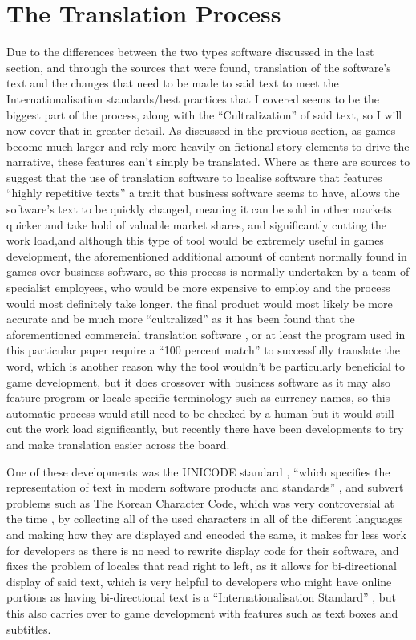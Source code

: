 \documentclass{scrartcl}
\begin{document}
\section{The Translation Process}
Due to the differences between the two types software discussed in the last section, and through the sources that were found, translation of the software's text and the changes that need to be made to said text to meet the Internationalisation standards/best practices that I covered seems to be the biggest part of the process, along with the ``Cultralization'' of said text, so I will now cover that in greater detail. As discussed in the previous section, as games become much larger and rely more heavily on fictional story elements to drive the narrative, these features can't simply be translated. Where as there are sources to suggest that the use of translation software to localise software that features ``highly repetitive texts'' \cite[pg.1]{schaler1994practical} a trait that business software seems to have, allows the software's text to be quickly changed, meaning it can be sold in other markets quicker and take hold of valuable market shares\cite[pg.1]{schaler1994practical}, and significantly cutting the work load,and although this type of tool would be extremely useful in games development, the aforementioned additional amount of content normally found in games over business software, so this process is normally undertaken by a team of specialist employees, who would be more expensive to employ and the process would most definitely take longer, the final product would most likely be more accurate and be much more ``cultralized'' as it has been found that the aforementioned commercial translation software , or at least the program used in this particular paper require a ``100 percent match'' to successfully translate the word, which is another reason why the tool wouldn't be particularly beneficial to game development, but it does crossover with business software as it may also feature program or locale specific terminology such as currency names\cite[pg.2]{schaler1994practical}, so this automatic process would still need to be checked by a human but it would still cut the work load significantly, but recently there have been developments to try and make translation easier across the board.

One of these developments was the UNICODE standard \cite{unicodestandards}, ``which specifies the representation of text in modern software products and standards'' \cite{schaler2004language}, and subvert problems such as The Korean Character Code\cite{park2016korean}, which was very controversial at the time , by collecting all of the used characters in all of the different languages and making how they are displayed and encoded the same, it makes for less work for developers as there is no need to rewrite display code for their software, and fixes the problem of locales that read right to left, as it allows for bi-directional display of said text, which is very helpful to developers who might have online portions as having bi-directional text is a ``Internationalisation Standard'' \cite{standards}, but this also carries over to game development with features such as text boxes and subtitles.  
\end{document}
